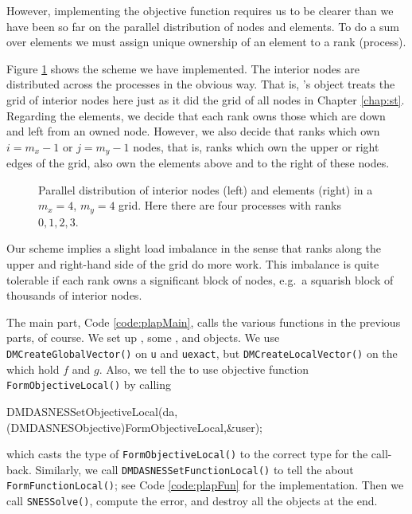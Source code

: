However, implementing the objective function requires us to be clearer than we have been so far on the parallel distribution of nodes and elements.  To do a sum over elements we must assign unique ownership of an element to a rank (process).


Figure \ref{fig:of:parallelgrid} shows the scheme we have implemented.  The interior nodes are distributed across the processes in the obvious way.  That is, \PETSc's \pDMDA object treats the grid of interior nodes here just as it did the grid of all nodes in Chapter \ref{chap:st}.  Regarding the elements, we decide that each rank owns those which are down and left from an owned node.  However, we also decide that ranks which own $i=m_x-1$ or $j=m_y-1$ nodes, that is, ranks which own the upper or right edges of the grid, also own the elements above and to the right of these nodes.

\begin{figure}

\caption{Parallel distribution of interior nodes (left) and elements (right) in a $m_x=4$, $m_y=4$ grid.  Here there are four processes with ranks $0,1,2,3$.}
\label{fig:of:parallelgrid}
\end{figure}

Our scheme implies a slight load imbalance in the sense that ranks along the upper and right-hand side of the grid do more work.  This imbalance is quite tolerable if each rank owns a significant block of nodes, e.g.~a squarish block of thousands of interior nodes.

The main part, Code \ref{code:plapMain}, calls the various functions in the previous parts, of course.  We set up \pDMDA, some \pVecs, and \pSNES objects.  We use \texttt{DMCreateGlobalVector()} on \texttt{u} and \texttt{uexact}, but \texttt{DMCreateLocalVector()} on the \pVecs which hold $f$ and $g$.  Also, we tell the \pSNES to use objective function \texttt{FormObjectiveLocal()} by calling
\begin{code}
    DMDASNESSetObjectiveLocal(da,(DMDASNESObjective)FormObjectiveLocal,&user);
\end{code}
which casts the type of \texttt{FormObjectiveLocal()} to the correct type for the call-back.  Similarly, we call \texttt{DMDASNESSetFunctionLocal()} to tell the \pDMDA about \texttt{FormFunctionLocal()}; see Code \ref{code:plapFun} for the implementation.  Then we call \texttt{SNESSolve()}, compute the error, and destroy all the objects at the end.

